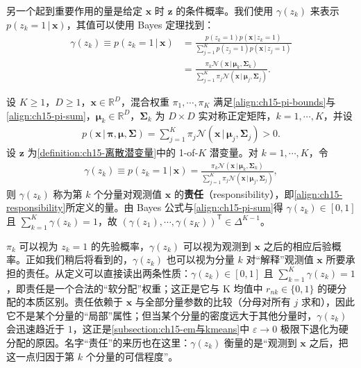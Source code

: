 \documentclass[../../main.tex]{subfiles}
\begin{document}
另一个起到重要作用的量是给定 $\bm{x}$ 时 $\bm{z}$ 的条件概率。我们使用 $\gamma(z_k)$ 来表示 $p(z_k=1\,|\,\bm{x})$，其值可以使用 Bayes 定理找到：
\begin{align}
\gamma(z_k)\equiv p(z_k=1\,|\,\bm{x})
&=\frac{p(z_k=1)p(\bm{x}\,|\,z_k=1)}{\sum_{j=1}^{K}p(z_j=1)p(\bm{x}\,|\,z_j=1)}\nonumber\\
&=\frac{\pi_k\mathcal{N}(\bm{x}\,|\,\bm{\mu}_k,\bm{\Sigma}_k)}{\sum_{j=1}^{K}\pi_j\mathcal{N}(\bm{x}\,|\,\bm{\mu}_j,\bm{\Sigma}_j)}.
\label{align:ch15-responsibility}
\end{align}

\begin{definition}[责任]\label{definition:ch15-责任}
设 $K\geqslant1$，$D\geqslant1$，$\bm{x}\in\mathbb{R}^{D}$，混合权重 $\pi_1,\cdots,\pi_K$ 满足\eqref{align:ch15-pi-bounds}与\eqref{align:ch15-pi-sum}，$\bm{\mu}_k\in\mathbb{R}^{D}$，$\bm{\Sigma}_k$ 为 $D\times D$ 实对称正定矩阵，$k=1,\cdots,K$，并设
\begin{align*}
p(\bm{x}\,|\,\bm{\pi},\bm{\mu},\bm{\Sigma})=\sum_{j=1}^{K}\pi_j\mathcal{N}(\bm{x}\,|\,\bm{\mu}_j,\bm{\Sigma}_j)>0.
\end{align*}
设 $\bm{z}$ 为\cref{definition:ch15-离散潜变量}中的 1-of-$K$ 潜变量。对 $k=1,\cdots,K$，令
\begin{align*}
\gamma(z_k)\equiv p(z_k=1\,|\,\bm{x})=\frac{\pi_k\mathcal{N}(\bm{x}\,|\,\bm{\mu}_k,\bm{\Sigma}_k)}{\sum_{j=1}^{K}\pi_j\mathcal{N}(\bm{x}\,|\,\bm{\mu}_j,\bm{\Sigma}_j)},
\end{align*}
则 $\gamma(z_k)$ 称为第 $k$ 个分量对观测值 $\bm{x}$ 的\textbf{责任}（responsibility），即\eqref{align:ch15-responsibility}所定义的量。由 Bayes 公式与\eqref{align:ch15-pi-sum}得 $\gamma(z_k)\in[0,1]$ 且 $\sum_{k=1}^{K}\gamma(z_k)=1$，故 $(\gamma(z_1),\cdots,\gamma(z_K))^{\mathsf T}\in\Delta^{K-1}$。
\end{definition}

\begin{remark}
$\pi_k$ 可以视为 $z_k=1$ 的先验概率，$\gamma(z_k)$ 可以视为观测到 $\bm{x}$ 之后的相应后验概率。正如我们稍后将看到的，$\gamma(z_k)$ 也可以视为分量 $k$ 对“解释”观测值 $\bm{x}$ 所要承担的责任。从定义可以直接读出两条性质：$\gamma(z_k)\in[0,1]$ 且 $\sum_{k=1}^{K}\gamma(z_k)=1$，即责任是一个合法的“软分配”权重；这正是它与 K 均值中 $r_{nk}\in\{0,1\}$ 的硬分配的本质区别。责任依赖于 $\bm{x}$ 与全部分量参数的比较（分母对所有 $j$ 求和），因此它不是某个分量的“局部”属性；但当某个分量的密度远大于其他分量时，$\gamma(z_k)$ 会迅速趋近于 $1$，这正是\cref{subsection:ch15-em与kmeans}中 $\varepsilon\to0$ 极限下退化为硬分配的原因。名字“责任”的来历也在这里：$\gamma(z_k)$ 衡量的是“观测到 $\bm{x}$ 之后，把这一点归因于第 $k$ 个分量的可信程度”。
\end{remark}
\end{document}
